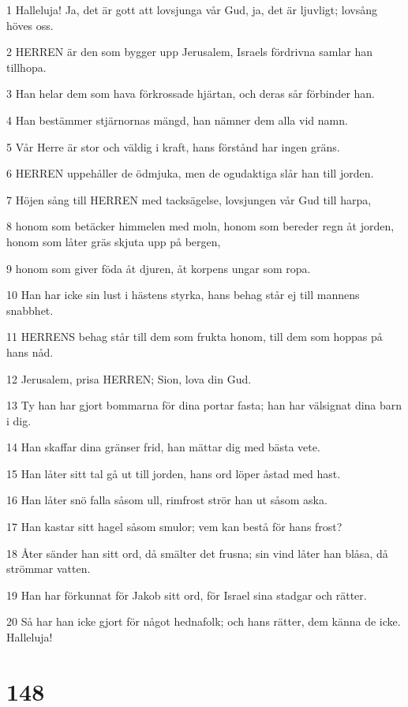 \par 1 Halleluja! Ja, det är gott att lovsjunga vår Gud, ja, det är ljuvligt; lovsång höves oss.
\par 2 HERREN är den som bygger upp Jerusalem, Israels fördrivna samlar han tillhopa.
\par 3 Han helar dem som hava förkrossade hjärtan, och deras sår förbinder han.
\par 4 Han bestämmer stjärnornas mängd, han nämner dem alla vid namn.
\par 5 Vår Herre är stor och väldig i kraft, hans förstånd har ingen gräns.
\par 6 HERREN uppehåller de ödmjuka, men de ogudaktiga slår han till jorden.
\par 7 Höjen sång till HERREN med tacksägelse, lovsjungen vår Gud till harpa,
\par 8 honom som betäcker himmelen med moln, honom som bereder regn åt jorden, honom som låter gräs skjuta upp på bergen,
\par 9 honom som giver föda åt djuren, åt korpens ungar som ropa.
\par 10 Han har icke sin lust i hästens styrka, hans behag står ej till mannens snabbhet.
\par 11 HERRENS behag står till dem som frukta honom, till dem som hoppas på hans nåd.
\par 12 Jerusalem, prisa HERREN; Sion, lova din Gud.
\par 13 Ty han har gjort bommarna för dina portar fasta; han har välsignat dina barn i dig.
\par 14 Han skaffar dina gränser frid, han mättar dig med bästa vete.
\par 15 Han låter sitt tal gå ut till jorden, hans ord löper åstad med hast.
\par 16 Han låter snö falla såsom ull, rimfrost strör han ut såsom aska.
\par 17 Han kastar sitt hagel såsom smulor; vem kan bestå för hans frost?
\par 18 Åter sänder han sitt ord, då smälter det frusna; sin vind låter han blåsa, då strömmar vatten.
\par 19 Han har förkunnat för Jakob sitt ord, för Israel sina stadgar och rätter.
\par 20 Så har han icke gjort för något hednafolk; och hans rätter, dem känna de icke. Halleluja!

\chapter{148}

